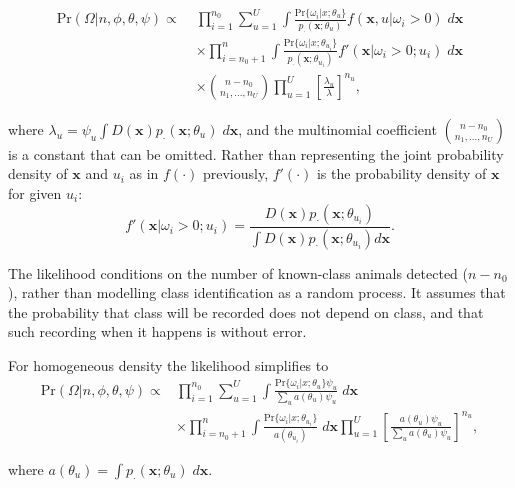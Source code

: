 \documentclass[
]{book}
\begin{document}
\begin{equation}
\begin{split}
 \mbox{Pr}(\Omega | n, \phi,\theta, \psi) \propto \; &\prod_{i=1}^{n_0}\sum_{u=1}^U\int\frac{\mbox{Pr}\{\omega_i | x; \theta_u\}}{p_\cdot(\mathbf{x} ; \theta_u)}
 f(\mathbf{x} ,u|\omega_i>0) \; d\mathbf{x}  \\
 &\times
 \prod_{i={n_0+1}}^n  \int \frac{\mbox{Pr}\{\omega_i | x; \theta_{u_i}\}}{p_\cdot(\mathbf{x} ; \theta_{u_i})}
 f'(\mathbf{x}  | \omega_i>0; u_i) \; d\mathbf{x}  \\
&\times {n - n_0 \choose n_1, ...,n_U}
\prod_{u=1}^U \left[  \frac{\lambda_u}{\lambda} \right] ^{n_u},
\end{split}
\label{eq:hybrid}
\end{equation}

where \(\lambda_u = \psi_u \int D(\mathbf{x} ) p_\cdot(\mathbf{x} ; \theta_u) \; d\mathbf{x}\), and the multinomial coefficient \({n - n_0 \choose n_1, ...,n_U}\) is a constant that can be omitted. Rather than representing the joint probability density of \(\mathbf{x}\) and \(u_i\) as in \(f(\cdot)\) previously, \(f'(\cdot)\) is the probability density of \(\mathbf{x}\) for given \(u_i\):
\[
  f'(\mathbf{x}  | \omega_i > 0; u_i) = \frac{D(\mathbf{x} )p_\cdot(\mathbf{x} ; \theta_{u_i})}{\int D(\mathbf{x} )p_\cdot(\mathbf{x} ; \theta_{u_i}) d\mathbf{x} }.
\]

The likelihood conditions on the number of known-class animals detected (\(n-n_0\)), rather than modelling class identification as a random process. It assumes that the probability that class will be recorded does not depend on class, and that such recording when it happens is without error.

For homogeneous density the likelihood simplifies to
\begin{equation}
\begin{split}
\mbox{Pr}(\Omega | n, \phi,\theta, \psi) \propto &\prod_{i=1}^{n_0}\sum_{u=1}^U\int\frac{\mbox{Pr}\{\omega_i | x; \theta_u\} \psi_u} {\sum_u a(\theta_u) \psi_u } \; d\mathbf{x}  
\\
&\times
\prod_{i={n_0+1}}^n  \int \frac{\mbox{Pr}\{\omega_i | x; \theta_{u_i}\}}{a(\theta_{u_i})} \; 
 d\mathbf{x}  
\prod_{u=1}^U {  \left[ \frac{a(\theta_u)\psi_u} {\sum_u a(\theta_u) \psi_u } \right] ^{n_u}},
\end{split}
\end{equation}

where \(a(\theta_u) = \int p_\cdot(\mathbf{x} ; \theta_{u}) \; d\mathbf{x}\).
\end{document}
